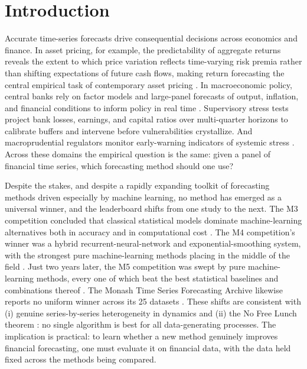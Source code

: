 \documentclass{article}
\begin{document}
\section{Introduction}
\label{sec:introduction}
\doublespacing

Accurate time-series forecasts drive consequential decisions across economics and finance. In asset pricing, for example, the predictability of aggregate returns reveals the extent to which price variation reflects time-varying risk premia rather than shifting expectations of future cash flows, making return forecasting the central empirical task of contemporary asset pricing \citep{Cochrane2011, Kelly2023}. In macroeconomic policy, central banks rely on factor models and large-panel forecasts of output, inflation, and financial conditions to inform policy in real time \citep{Stock2002, McCracken2016}. Supervisory stress tests project bank losses, earnings, and capital ratios over multi-quarter horizons to calibrate buffers and intervene before vulnerabilities crystallize. And macroprudential regulators monitor early-warning indicators of systemic stress \citep{Adrian2015, Oet2011}. Across these domains the empirical question is the same: given a panel of financial time series, which forecasting method should one use?

Despite the stakes, and despite a rapidly expanding toolkit of forecasting methods driven especially by machine learning, no method has emerged as a universal winner, and the leaderboard shifts from one study to the next. The M3 competition concluded that classical statistical models dominate machine-learning alternatives both in accuracy and in computational cost \citep{Makridakis2018}. The M4 competition's winner was a hybrid recurrent-neural-network and exponential-smoothing system, with the strongest pure machine-learning methods placing in the middle of the field \citep{Makridakis2020}. Just two years later, the M5 competition was swept by pure machine-learning methods, every one of which beat the best statistical baselines and combinations thereof \citep{Makridakis2022}. The Monash Time Series Forecasting Archive likewise reports no uniform winner across its 25 datasets \citep{Godahewa2021}. These shifts are consistent with (i) genuine series-by-series heterogeneity in dynamics and (ii) the No Free Lunch theorem \citep{Wolpert1997}: no single algorithm is best for all data-generating processes. The implication is practical: to learn whether a new method genuinely improves financial forecasting, one must evaluate it on financial data, with the data held fixed across the methods being compared.
\end{document}
